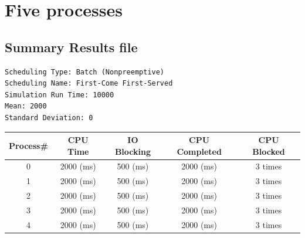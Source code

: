 \section{Five processes}
\newpage
\subsection{Summary Results file}
\begin{lstlisting}
Scheduling Type: Batch (Nonpreemptive)
Scheduling Name: First-Come First-Served
Simulation Run Time: 10000
Mean: 2000
Standard Deviation: 0
\end{lstlisting}
\begin{center}                        
\begin{tabular}{| c | c | c | c | c |}                                      
\hline                                                                      
Process\# &     CPU Time &      IO Blocking & CPU Completed & CPU Blocked \\
\hline
0&		2000 (ms)&	500 (ms)&	2000 (ms)&	3 times \\
\hline
1&		2000 (ms)&	500 (ms)&	2000 (ms)&	3 times \\
\hline
2&		2000 (ms)&	500 (ms)&	2000 (ms)&	3 times \\
\hline
3&		2000 (ms)&	500 (ms)&	2000 (ms)&	3 times \\
\hline
4&		2000 (ms)&	500 (ms)&	2000 (ms)&	3 times \\
\hline
\end{tabular}
\end{center}
           
